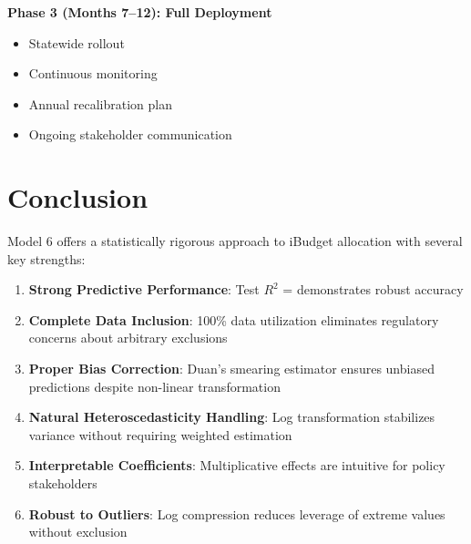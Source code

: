\textbf{Phase 3 (Months 7--12): Full Deployment}
\begin{itemize}
    \item Statewide rollout
    \item Continuous monitoring
    \item Annual recalibration plan
    \item Ongoing stakeholder communication
\end{itemize}

\section{Conclusion}

Model 6 offers a statistically rigorous approach to iBudget allocation with several key strengths:

\begin{enumerate}
    \item \textbf{Strong Predictive Performance}: Test $R^2$ = \MRSquaredTest{} demonstrates robust accuracy
    
    \item \textbf{Complete Data Inclusion}: 100\% data utilization eliminates regulatory concerns about arbitrary exclusions
    
    \item \textbf{Proper Bias Correction}: Duan's smearing estimator ensures unbiased predictions despite non-linear transformation
    
    \item \textbf{Natural Heteroscedasticity Handling}: Log transformation stabilizes variance without requiring weighted estimation
    
    \item \textbf{Interpretable Coefficients}: Multiplicative effects are intuitive for policy stakeholders
    
    \item \textbf{Robust to Outliers}: Log compression reduces leverage of extreme values without exclusion
\end{enumerate}

